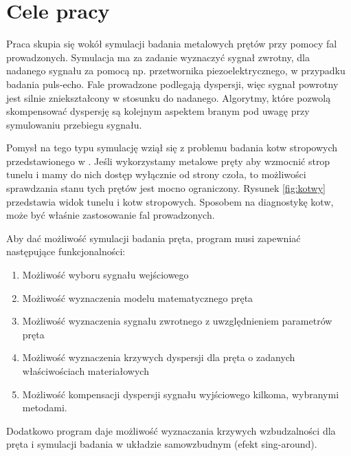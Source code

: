 \section{Cele pracy}
\label{sec:cel}


Praca skupia się wokół symulacji badania metalowych prętów przy pomocy fal prowadzonych. Symulacja ma za zadanie wyznaczyć sygnał zwrotny, dla nadanego sygnału za pomocą np. przetwornika piezoelektrycznego, w przypadku badania puls-echo. Fale prowadzone podlegają dyspersji, więc sygnał powrotny jest silnie zniekształcony w stosunku do nadanego. Algorytmy, które pozwolą skompensować dyspersję są kolejnym aspektem branym pod uwagę przy symulowaniu przebiegu sygnału.

Pomysł na tego typu symulację wziął się z problemu badania kotw stropowych przedstawionego w \cite{kotwy}. Jeśli wykorzystamy metalowe pręty aby wzmocnić strop tunelu i mamy do nich dostęp wyłącznie od strony czoła, to możliwości sprawdzania stanu tych prętów jest mocno ograniczony. Rysunek \ref{fig:kotwy} przedstawia widok tunelu i kotw stropowych. Sposobem na diagnostykę kotw, może być właśnie zastosowanie fal prowadzonych. 

Aby dać możliwość symulacji badania pręta, program musi zapewniać następujące funkcjonalności:
\begin{enumerate}
  \item Możliwość wyboru sygnału wejściowego
  \item Możliwość wyznaczenia modelu matematycznego pręta
  \item Możliwość wyznaczenia sygnału zwrotnego z uwzględnieniem parametrów pręta
  \item Możliwość wyznaczenia krzywych dyspersji dla pręta o zadanych właściwościach materiałowych
  \item Możliwość kompensacji dyspersji sygnału wyjściowego kilkoma, wybranymi metodami.
\end{enumerate}

\vspace{5mm}

Dodatkowo program daje możliwość wyznaczania krzywych wzbudzalności dla pręta i symulacji badania w układzie samowzbudnym (efekt sing-around).



















